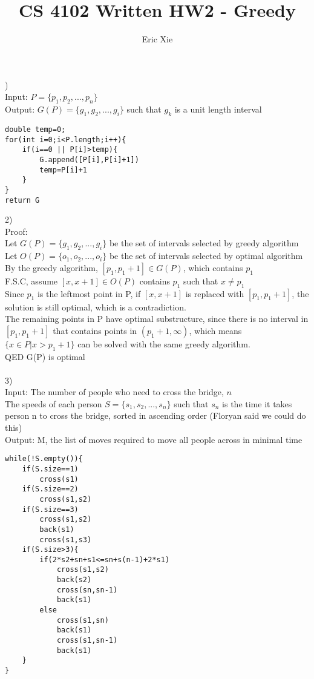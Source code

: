 \documentclass[a4paper,12pt]{article}
\title{CS 4102 Written HW2 - Greedy}
\author{Eric Xie}
\begin{document}
) \\
Input: $P = \{p_1,p_2,...,p_n\}$\\
Output: $G(P) = \{g_1,g_2,...,g_i\}$ such that $g_k$ is a unit length interval\\
\begin{lstlisting}
double temp=0;
for(int i=0;i<P.length;i++){
	if(i==0 || P[i]>temp){
		G.append([P[i],P[i]+1])
		temp=P[i]+1
	}
}
return G
\end{lstlisting}
2) \\
Proof:\\ 
Let  $G(P) = \{g_1,g_2,...,g_i\}$  be the set of intervals selected by greedy algorithm\\
Let $O(P) = \{o_1,o_2,...,o_i\}$  be the set of intervals selected by optimal algorithm\\
By the greedy algorithm, $[p_1,p_1+1]\in G(P)$, which contains $p_1$ \\
F.S.C, assume $[x,x+1]\in O(P)$ contains $p_1$ such that $x\neq p_1$ \\
Since $p_1$ is the leftmost point in P, if $[x,x+1]$ is replaced with $[p_1,p_1+1]$, the solution is still optimal, which is a contradiction. \\
The remaining points in P have optimal substructure, since there is no interval in $[p_1,p_1+1]$ that contains points in $(p_1+1,\infty)$, which means $\{x \in P|x>p_1+1\}$ can be solved with the same greedy algorithm.  \\
QED G(P) is optimal\\\\
3)\\
Input: The number of people who need to cross the bridge, $n$ \\
The speeds of each person $S=\{s_1,s_2,...,s_n\}$ such that $s_n$ is the time it takes person n to cross the bridge, sorted in ascending order (Floryan said we could do this) \\
Output: M, the list of moves required to move all people across in minimal time\\
\begin{lstlisting}
while(!S.empty()){
	if(S.size==1)
		cross(s1)
	if(S.size==2)
		cross(s1,s2)
	if(S.size==3)
		cross(s1,s2)
		back(s1)
		cross(s1,s3)
	if(S.size>3){
		if(2*s2+sn+s1<=sn+s(n-1)+2*s1)
			cross(s1,s2)
			back(s2)
			cross(sn,sn-1)
			back(s1)
		else
			cross(s1,sn)
			back(s1)
			cross(s1,sn-1)
			back(s1)
	}
}
\end{lstlisting}
\end{document}

